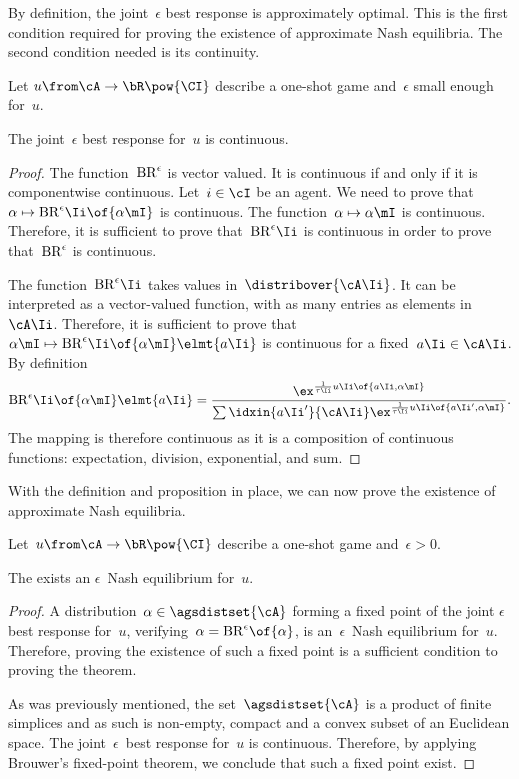 By definition, the joint~\(\epsilon\) best response is approximately optimal.
This is the first condition required for proving the existence of approximate Nash equilibria.
The second condition needed is its continuity.

\begin{proposition}
Let \(u \from \cA \to \bR\pow{\CI}\) describe a one-shot game and~\(\epsilon\) small enough for~\(u\).

The joint~\(\epsilon\) best response for~\(u\) is continuous.
\end{proposition}

\begin{proof}
The function~\(\mathrm{BR}^{\epsilon}\) is vector valued.
It is continuous if and only if it is componentwise continuous.
Let~\(i \in \cI\) be an agent.
We need to prove that~\(\alpha \mapsto \sbr\Ii \of{\alpha\mI}\) is continuous.
The function~\(\alpha \mapsto \alpha\mI\) is continuous.
Therefore, it is sufficient to prove that~\(\sbr\Ii\) is continuous in order to prove that~\(\mathrm{BR}^{\epsilon}\) is continuous.

The function~\(\sbr\Ii\) takes values in~\(\distribover{\cA\Ii}\).
It can be interpreted as a vector-valued function, with as many entries as elements in~\(\cA\Ii\).
Therefore, it is sufficient to prove that~\(\alpha\mI \mapsto \sbr\Ii \of{\alpha\mI} \elmt{a\Ii}\) is continuous for a fixed~\(a\Ii \in \cA\Ii\).
By definition
\[
\sbr\Ii \of{\alpha\mI} \elmt{a\Ii}
=
\frac{\ex^{\frac{1}{\tau\Ii} u\Ii \of {a\Ii, \alpha\mI}}}{\sum\idxin{a\Ii'}{\cA\Ii}\ex^{\frac{1}{\tau\Ii} u\Ii \of {a\Ii', \alpha\mI}}}.
\]
The mapping is therefore continuous as it is a composition of continuous functions: expectation, division, exponential, and sum.
\end{proof}

With the definition and proposition in place, we can now prove the existence of approximate Nash equilibria.

\begin{theorem}
\label{res:approximate_nash_existence}
Let~\(u \from \cA \to \bR\pow{\CI}\) describe a one-shot game and~\(\epsilon > 0\).

The exists an \(\epsilon\)~Nash equilibrium for~\(u\).
\end{theorem}

\begin{proof}
A distribution~\(\alpha \in \agsdistset{\cA}\) forming a fixed point of the joint \(\epsilon\) best response for~\(u\), \ie verifying~\(\alpha = \sbr \of{\alpha}\), is an~\(\epsilon\)~Nash equilibrium for~\(u\).
Therefore, proving the existence of such a fixed point is a sufficient condition to proving the theorem.

As was previously mentioned, the set~\(\agsdistset{\cA}\) is a product of finite simplices and as such is non-empty, compact and a convex subset of an Euclidean space.
The joint~\(\epsilon\)~best response for~\(u\) is continuous.
Therefore, by applying Brouwer's fixed-point theorem, we conclude that such a fixed point exist.
\end{proof}

